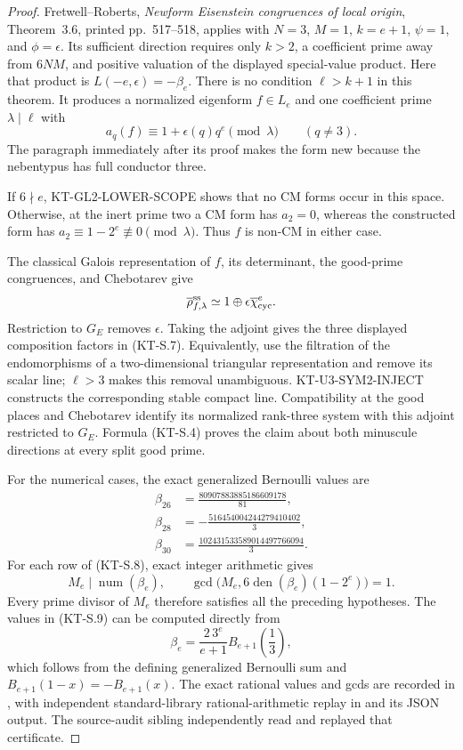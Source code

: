 \documentclass[11pt,a4paper]{article}
\theoremstyle{definition}
\begin{document}
\begin{proof}
Fretwell--Roberts, \emph{Newform Eisenstein congruences of
local origin}, Theorem~3.6, printed pp.~517--518, applies
with $N=3$, $M=1$, $k=e+1$, $\psi=1$, and
$\phi=\epsilon$.  Its sufficient direction requires only
$k>2$, a coefficient prime away from $6NM$, and positive
valuation of the displayed special-value product.
Here that product is $L(-e,\epsilon)=-\beta_e$.
There is no condition $\ell>k+1$ in this theorem.
It produces a normalized eigenform $f\in L_e$ and one
coefficient prime $\lambda\mid\ell$ with
\[
     a_q(f)\equiv1+\epsilon(q)q^e\pmod\lambda
                 \qquad(q\ne3).
\]
The paragraph immediately after its proof makes the form new
because the nebentypus has full conductor three.

If $6\nmid e$, KT-GL2-LOWER-SCOPE shows that no CM forms
occur in this space.  Otherwise, at the inert prime two a CM
form has $a_2=0$, whereas the constructed form has
$a_2\equiv1-2^e\not\equiv0\pmod\lambda$.
Thus $f$ is non-CM in either case.

The classical Galois representation of $f$, its determinant,
the good-prime congruences, and Chebotarev give
\[
     \overline\rho_{f,\lambda}^{\rm ss}
       \simeq1\oplus\epsilon\overline\chi_{\rm cyc}^{e}.
\]
Restriction to $G_E$ removes $\epsilon$.
Taking the adjoint gives the three displayed composition
factors in (KT-S.7).  Equivalently, use the filtration of the
endomorphisms of a two-dimensional triangular representation
and remove its scalar line; $\ell>3$ makes this removal
unambiguous.  KT-U3-SYM2-INJECT constructs the corresponding
stable compact line.  Compatibility at the good places and
Chebotarev identify its normalized rank-three system with this
adjoint restricted to $G_E$.  Formula (KT-S.4) proves the
claim about both minuscule directions at every split good
prime.

For the numerical cases, the exact generalized Bernoulli
values are
\[
 \begin{aligned}
 \beta_{26}&=\frac{80907883885186609178}{81},\\
 \beta_{28}&=-\frac{516454004244279410402}{3},\\
 \beta_{30}&=\frac{102431533589014497766094}{3}.
 \end{aligned}                                                \tag{KT-S.9}
\]
For each row of (KT-S.8), exact integer arithmetic gives
\[
 M_e\mid\operatorname{num}(\beta_e),\qquad
 \gcd\bigl(M_e,6\operatorname{den}(\beta_e)(1-2^e)\bigr)=1.
\]
Every prime divisor of $M_e$ therefore satisfies all the
preceding hypotheses.  The values in (KT-S.9) can be computed
directly from
\[
 \beta_e=\frac{2\,3^e}{e+1}
                 B_{e+1}\!\left(\frac13\right),
\]
which follows from the defining generalized Bernoulli sum
and $B_{e+1}(1-x)=-B_{e+1}(x)$.
The exact rational values and gcds are recorded in
, with independent
standard-library rational-arithmetic replay in
and its JSON output.  The source-audit sibling independently
read and replayed that certificate.
\end{proof}
\end{document}
